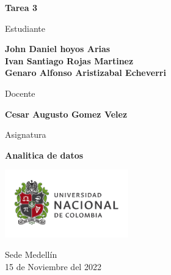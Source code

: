 \begin{titlepage}
   \Large{
   \begin{center}
       \vspace*{1cm}

       \textbf{Tarea 3}

            
       \vspace{1.1cm}
       
       Estudiante
       
       \vspace{0.5cm}
        

       \textbf{John Daniel hoyos Arias} \\

       \textbf{Ivan Santiago Rojas Martinez} \\
       
       \textbf{Genaro Alfonso Aristizabal Echeverri}




       \vspace{1cm}
       
       Docente
       
       \vspace{0.5cm}

       \textbf{Cesar Augusto Gomez Velez}
       
       \vspace{0.4cm}

       \vspace{1.4cm}
       
       Asignatura
       
       \vspace{0.5cm}

       \textbf{Analitica de datos}

       \vfill

            
       \vspace{0.4cm}
     
       \includegraphics[width=0.4\textwidth]{DocumentFormat/logounal.png}
            
       Sede Medellín\\
       15 de Noviembre del 2022
       
   \end{center}
   }
\end{titlepage}
